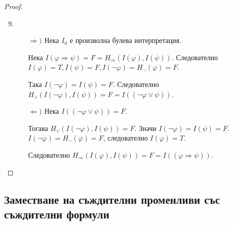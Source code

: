 \documentclass{article}
\def\Proofs{1}
\begin{document}
\begin{prop}
\ifcase\Proofs\or
\begin{proof}
$\ $
\begin{enumerate}
\setcounter{enumi}{8}
\item 
\begin{itemize}
\item[$\Rightarrow)$]
Нека $I_0$ е произволна булева интерпретация.

Нека $I(\varphi \Rightarrow \psi) = F = H_\Rightarrow(I(\varphi), I(\psi))$. Следователно $I(\varphi) = T, I(\psi) = F, I(\neg\varphi) = H_\neg(\varphi) = F$.

Така $I(\neg\varphi) = I(\psi) = F$. Следователно $H_\lor(I(\neg\varphi), I(\psi)) = F = I((\neg\varphi \lor \psi))$.

\item[$\Leftarrow)$]
Нека $I((\neg\varphi \lor \psi)) = F$.

Тогава $H_\lor(I(\neg\varphi), I(\psi)) = F$. Значи $I(\neg\varphi) = I(\psi) = F$. $I(\neg\varphi) = H_\neg(\varphi) = F$, следователно $I(\varphi) = T$.

Следователно $H_\Rightarrow(I(\varphi), I(\psi)) = F = I((\varphi \Rightarrow \psi))$.
\end{itemize}

\end{enumerate}

\end{proof}
\fi
\end{prop}

\iffalse
\begin{proof}
(\ref{sv-2-9}) Нека $I$ е произволна булева интерпретация:
\begin{enumerate}
\item $I[\varphi \Rightarrow \psi] = T$, т.е. $H_\Rightarrow[I[\varphi], I[\psi]] = T$, т.е. или $I[\varphi] = I[\psi] = T$, или $I[\varphi] = F$ и $I[\psi] = T$, или $I[\varphi] = I[\psi] = F$, където и за трите възможности е изпълнено $I[\neg\varphi \lor \psi] = H_\lor[H_\neg[I[\varphi]], I[\psi]] = T$.
\item $I[\varphi \Rightarrow \psi] = F$, т.е. $H_\Rightarrow[I[\varphi], I[\psi]] = F$, т.е. $I[\varphi] = T$ и $I[\psi] = F$, където е изпълнено $I[\neg\varphi \lor \psi] = H_\lor[H_\neg[I[\varphi]], I[\psi]] = F$.
\end{enumerate}
\end{proof}
\fi

\subsection*{Заместване на съждителни променливи със съждителни формули}
\end{document}
